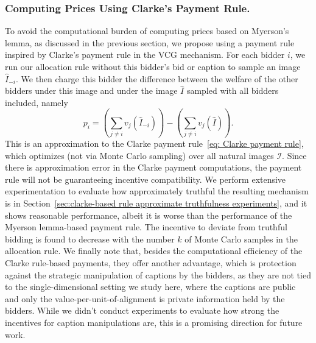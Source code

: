 \documentclass[format=acmsmall, review=false]{acmart}
\begin{document}
\subsubsection{Computing Prices Using Clarke's Payment Rule.} \label{sec:payments via Clarke's rule} 
To avoid the computational burden of computing prices based on Myerson's lemma, as discussed in the previous section, we propose using a payment rule inspired by Clarke's payment rule in the VCG mechanism. For each bidder $i$, we run our allocation rule without this bidder's bid or caption to sample an image $\hat{I}_{-i}$. We then charge this bidder the difference between the welfare of the other bidders  under this image and under the image $\hat I$ sampled with all bidders included, namely 
\begin{equation}
    p_i = \left( \sum_{j \neq i} v_j(\hat{I}_{-i}) \right) - \left( \sum_{j \neq i} v_j(\hat{I}) \right).
\end{equation}
This is an approximation to the Clarke payment rule~\eqref{eq: Clarke payment rule}, which optimizes (not via Monte Carlo sampling) over all natural images $\mathcal{I}$. Since there is approximation error in the Clarke payment computations, the payment rule will not be guaranteeing incentive compatibility. We perform extensive experimentation to evaluate how approximately truthful the resulting mechanism is in Section~\ref{sec:clarke-based rule approximate truthfulness experiments}, and it shows reasonable performance, albeit it is worse than the performance of the Myerson lemma-based payment rule. The incentive to deviate from truthful bidding is found to decrease with the number $k$ of Monte Carlo samples in the allocation rule. We finally note that, besides the computational efficiency of the Clarke rule-based payments, they offer another advantage, which is protection against the strategic manipulation of captions by the bidders, as they are not tied to the single-dimensional setting we study here, where the captions are public and only the value-per-unit-of-alignment is private information held by the bidders. While we didn't conduct experiments to evaluate how strong the incentives for caption manipulations are, this is a promising direction for future work.

\end{document}
